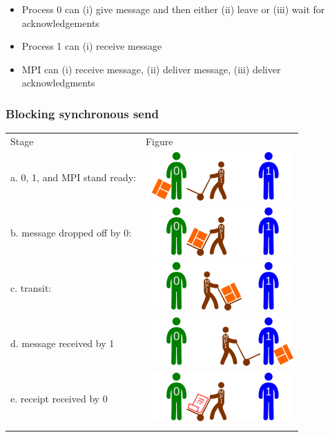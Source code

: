 \begin{itemize}
\itemsep1pt\parskip0pt
\item
  Process 0 can (i) give message and then either (ii) leave or (iii)
  wait for acknowledgements
\item
  Process 1 can (i) receive message
\item
  MPI can (i) receive message, (ii) deliver message, (iii) deliver
  acknowledgments
\end{itemize}

\subsubsection{Blocking synchronous
send}\label{blocking-synchronous-send}

\begin{longtable}[c]{@{}ll@{}}
\toprule\addlinespace
Stage & Figure
\\\addlinespace
\midrule\endhead
a. 0, 1, and MPI stand ready: &
\includegraphics{06MPI/figures/sync0.png}
\\\addlinespace
b. message dropped off by 0: & \includegraphics{06MPI/figures/sync1.png}
\\\addlinespace
c. transit: & \includegraphics{06MPI/figures/syncT.png}
\\\addlinespace
d. message received by 1 & \includegraphics{06MPI/figures/syncA.png}
\\\addlinespace
e. receipt received by 0 & \includegraphics{06MPI/figures/syncR.png}
\\\addlinespace
\bottomrule
\end{longtable}

